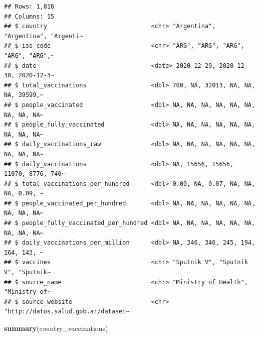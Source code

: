 \documentclass[
]{book}
\newenvironment{Shaded}{\begin{snugshade}}{\end{snugshade}}
\newcommand{\KeywordTok}[1]{\textcolor[rgb]{0.13,0.29,0.53}{\textbf{#1}}}
\newcommand{\NormalTok}[1]{#1}
\begin{document}
\begin{verbatim}
## Rows: 1,816
## Columns: 15
## $ country                             <chr> "Argentina", "Argentina", "Argenti~
## $ iso_code                            <chr> "ARG", "ARG", "ARG", "ARG", "ARG",~
## $ date                                <date> 2020-12-29, 2020-12-30, 2020-12-3~
## $ total_vaccinations                  <dbl> 700, NA, 32013, NA, NA, NA, 39599,~
## $ people_vaccinated                   <dbl> NA, NA, NA, NA, NA, NA, NA, NA, NA~
## $ people_fully_vaccinated             <dbl> NA, NA, NA, NA, NA, NA, NA, NA, NA~
## $ daily_vaccinations_raw              <dbl> NA, NA, NA, NA, NA, NA, NA, NA, NA~
## $ daily_vaccinations                  <dbl> NA, 15656, 15656, 11070, 8776, 740~
## $ total_vaccinations_per_hundred      <dbl> 0.00, NA, 0.07, NA, NA, NA, 0.09, ~
## $ people_vaccinated_per_hundred       <dbl> NA, NA, NA, NA, NA, NA, NA, NA, NA~
## $ people_fully_vaccinated_per_hundred <dbl> NA, NA, NA, NA, NA, NA, NA, NA, NA~
## $ daily_vaccinations_per_million      <dbl> NA, 346, 346, 245, 194, 164, 143, ~
## $ vaccines                            <chr> "Sputnik V", "Sputnik V", "Sputnik~
## $ source_name                         <chr> "Ministry of Health", "Ministry of~
## $ source_website                      <chr> "http://datos.salud.gob.ar/dataset~
\end{verbatim}

\begin{Shaded}
\begin{Highlighting}[]
\KeywordTok{summary}\NormalTok{(country_vaccinations)}
\end{Highlighting}
\end{Shaded}
\end{document}
